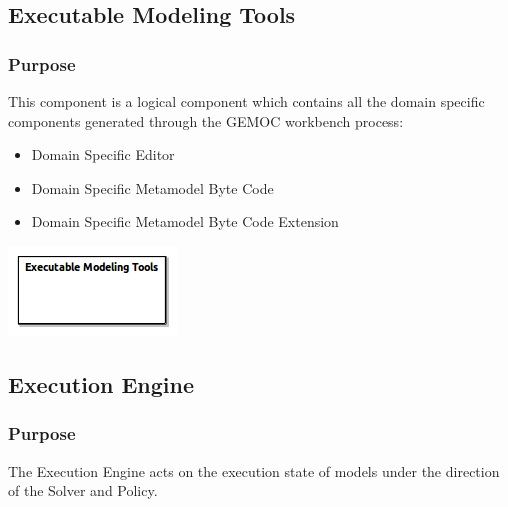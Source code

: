 \documentclass{gemoc} %
\begin{document}
\subsection{Executable Modeling Tools}
\label{sec:Executable_Modeling_Tools}


\subsubsection{Purpose}
This component is a logical component which contains all the domain specific components generated through the GEMOC workbench process:  
\begin{itemize}
\item Domain Specific Editor
\item Domain Specific Metamodel Byte Code
\item Domain Specific Metamodel Byte Code Extension
\end{itemize}

\begin{center}
\includegraphics*[trim=0.0cm 0.0cm 0cm 0.0cm, clip=true]{../images/generated/Generated_Executable_Modeling_Tools.png}
\end{center}




\subsection{Execution Engine}
\label{sec:Execution_Engine}


\subsubsection{Purpose}
The Execution Engine acts on the execution state of models under the direction of the Solver and Policy.
\end{document}
